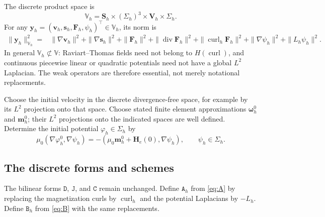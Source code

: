 \documentclass[11pt,a4paper]{article}
\newcommand{\bs}{\boldsymbol}
\DeclareMathOperator{\curl}{curl}
\DeclareMathOperator{\ddiv}{div}
\newcommand{\Div}{\ddiv}
\newcommand{\V}{\mathbb V}
\newcommand{\DD}{\mathtt D}
\newcommand{\Aform}{\mathtt A}
\newcommand{\JJ}{\mathtt J}
\newcommand{\BB}{\mathtt B}
\newcommand{\CC}{\mathtt C}
\theoremstyle{definition}
\numberwithin{equation}{section}
\begin{document}
The discrete product space is
\begin{equation}\label{eq:Vh}
 \V_h=\bs S_h\times(\Sigma_h)^3\times\bs V_h\times\Sigma_h.
\end{equation}
For any $\bs y_h = (\bs v_h,\bs s_h,\bs F_h,\psi_h)^\intercal \in \V_h$, its norm is
\begin{equation}\label{eq:Vh-norm}
\begin{aligned}
 \|\bs y_h\|_{\V_h}^2={}&\|\nabla\bs v_h\|^2+\|\nabla\bs s_h\|^2
 +\|\bs F_h\|^2+\|\Div\bs F_h\|^2+\|\curl_h\bs F_h\|^2
 +\|\nabla\psi_h\|^2+\|L_h\psi_h\|^2.
\end{aligned}
\end{equation}
In general $\V_h\not\subset\V$: Raviart--Thomas fields need not belong to $H(\curl)$, and continuous piecewise linear or quadratic potentials need not have a global $L^2$ Laplacian. The weak operators are therefore essential, not merely notational replacements.

Choose the initial velocity in the discrete divergence-free space, for example by its $L^2$ projection onto that space. Choose stated finite element approximations $\bs\omega_h^0$ and $\bs m_h^0$; their $L^2$ projections onto the indicated spaces are well defined. Determine the initial potential $\varphi_h\in \Sigma_h$ by
\begin{equation}\label{eq:discrete-phi0}
 \mu_0(\nabla\varphi_h^0,\nabla\psi_h)
 =-(\mu_0\bs m_h^0+\bs H_e(0),\nabla\psi_h),\qquad\psi_h\in\Sigma_h.
\end{equation}

\subsection{The discrete forms and schemes}
The bilinear forms $\DD$, $\JJ$, and $\CC$ remain unchanged. Define $\Aform_h$ from \eqref{eq:A} by replacing the magnetization curls by $\curl_h$ and the potential Laplacians by $-L_h$. Define $\BB_h$ from \eqref{eq:B} with the same replacements. 
\end{document}
